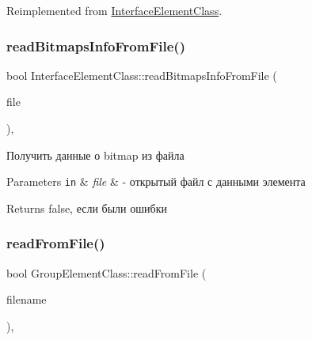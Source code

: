 Reimplemented from \hyperlink{class_interface_element_class_a6dbf6a318a5e4b60b58a7652d2e54b0a}{Interface\+Element\+Class}.

\mbox{\label{class_interface_element_class_a80958e5556a2970645b65a56431c88ca}} 
\subsubsection{\texorpdfstring{read\+Bitmaps\+Info\+From\+File()}{readBitmapsInfoFromFile()}}
{\footnotesize\ttfamily bool Interface\+Element\+Class\+::read\+Bitmaps\+Info\+From\+File (\begin{DoxyParamCaption}\item[{std\+::ifstream $\ast$}]{file }\end{DoxyParamCaption})\hspace{0.3cm}{\ttfamily [protected]}, {\ttfamily [inherited]}}



Получить данные о bitmap из файла 


\begin{DoxyParams}[1]{Parameters}
\mbox{\tt in}  & {\em file} & -\/ открытый файл с данными элемента \\
\hline
\end{DoxyParams}
\begin{DoxyReturn}{Returns}
false, если были ошибки 
\end{DoxyReturn}
\mbox{\label{class_group_element_class_aaf510a287861dc4096cbe14f0551c8f5}} 
\subsubsection{\texorpdfstring{read\+From\+File()}{readFromFile()}}
{\footnotesize\ttfamily bool Group\+Element\+Class\+::read\+From\+File (\begin{DoxyParamCaption}\item[{\hyperlink{class_path_class}{Path\+Class} $\ast$}]{filename }\end{DoxyParamCaption})\hspace{0.3cm}{\ttfamily [private]}, {\ttfamily [virtual]}}



